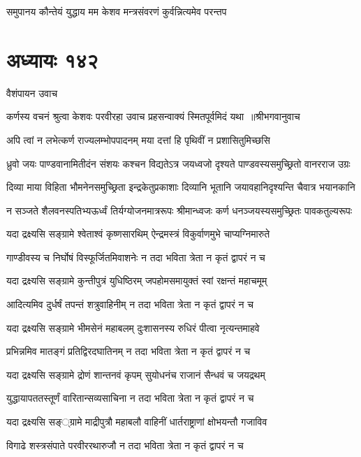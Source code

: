 \twolineshloka
{समुपानय कौन्तेयं युद्धाय मम केशव}
{मन्त्रसंवरणं कुर्वन्नित्यमेव परन्तप}


\chapter{अध्यायः १४२}
\twolineshloka
{वैशंपायन उवाच}
{}


\threelineshloka
{कर्णस्य वचनं श्रुत्वा केशवः परवीरहा}
{उवाच प्रहसन्वाक्यं स्मितपूर्वमिदं यथा ॥श्रीभगवानुवाच}
{}


\twolineshloka
{अपि त्वां न लभेत्कर्ण राज्यलम्भोपपादनम्}
{मया दत्तां हि पृथिवीं न प्रशासितुमिच्छसि}


\threelineshloka
{ध्रुवो जयः पाण्डवानामितीदंन संशयः कश्चन विद्यतेऽत्र}
{जयध्वजो दृश्यते पाण्डवस्यसमुच्छ्रितो वानरराज उग्रः}
{}


\twolineshloka
{दिव्या माया विहिता भौमनेनसमुच्छ्रिता इन्द्रकेतुप्रकाशाः}
{दिव्यानि भूतानि जयावहानिदृश्यन्ति चैवात्र भयानकानि}


\twolineshloka
{न सञ्जते शैलवनस्पतिभ्यऊर्ध्वं तिर्यग्योजनमात्ररूपः}
{श्रीमान्ध्वजः कर्ण धनञ्जयस्यसमुच्छ्रितः पावकतुल्यरूपः}


\twolineshloka
{यदा द्रक्ष्यसि सङ्ग्रामे श्वेताश्वं कृष्णसारथिम्}
{ऐन्द्रमस्त्रं विकुर्वाणमुभे चाप्यग्निमारुते}


\twolineshloka
{गाण्डीवस्य च निर्घोषं विस्फूर्जितमिवाशनेः}
{न तदा भविता त्रेता न कृतं द्वापरं न च}


\twolineshloka
{यदा द्रक्ष्यसि सङ्ग्रामे कुन्तीपुत्रं युधिष्ठिरम्}
{जपहोमसमायुक्तं स्वां रक्षन्तं महाचमूम्}


\twolineshloka
{आदित्यमिव दुर्धर्षं तपन्तं शत्रुवाहिनीम्}
{न तदा भविता त्रेता न कृतं द्वापरं न च}


\twolineshloka
{यदा द्रक्ष्यसि सङ्ग्रामे भीमसेनं महाबलम्}
{दुःशासनस्य रुधिरं पीत्वा नृत्यन्तमाहवे}


\twolineshloka
{प्रभिन्नमिव मातङ्गं प्रतिद्विरदघातिनम्}
{न तदा भविता त्रेता न कृतं द्वापरं न च}


\twolineshloka
{यदा द्रक्ष्यसि सङ्ग्रामे द्रोणं शान्तनवं कृपम्}
{सुयोधनंच राजानं सैन्धवं च जयद्रथम्}


\twolineshloka
{युद्धायापततस्तूर्णं वारितान्सव्यसाचिना}
{न तदा भविता त्रेता न कृतं द्वापरं न च}


\twolineshloka
{यदा द्रक्ष्यसि सङ््ग्रामे माद्रीपुत्रौ महाबलौ}
{वाहिनीं धार्तराष्ट्राणां क्षोभयन्तौ गजाविव}


\twolineshloka
{विगाढे शस्त्रसंपाते परवीररथारुजौ}
{न तदा भविता त्रेता न कृतं द्वापरं न च}


